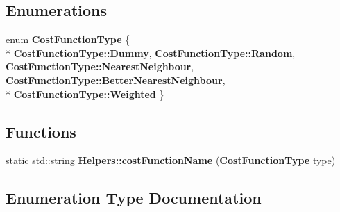 \subsection*{Enumerations}
\begin{DoxyCompactItemize}
\item 
enum {\bf Cost\+Function\+Type} \{ \\*
{\bf Cost\+Function\+Type\+::\+Dummy}, 
{\bf Cost\+Function\+Type\+::\+Random}, 
{\bf Cost\+Function\+Type\+::\+Nearest\+Neighbour}, 
{\bf Cost\+Function\+Type\+::\+Better\+Nearest\+Neighbour}, 
\\*
{\bf Cost\+Function\+Type\+::\+Weighted}
 \}
\end{DoxyCompactItemize}
\subsection*{Functions}
\begin{DoxyCompactItemize}
\item 
static std\+::string {\bf Helpers\+::cost\+Function\+Name} ({\bf Cost\+Function\+Type} type)
\end{DoxyCompactItemize}


\subsection{Enumeration Type Documentation}

